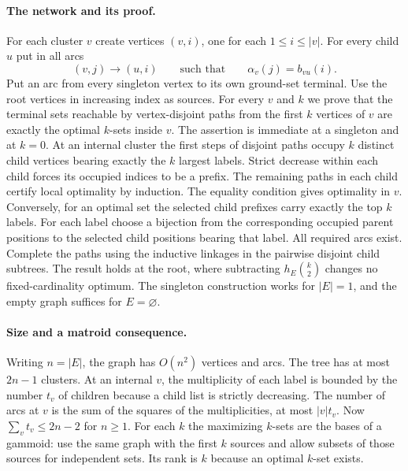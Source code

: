 \documentclass[11pt,a4paper]{article}
\begin{document}
\paragraph{The network and its proof.}
For each cluster $v$ create vertices $(v,i)$, one for each $1\le i\le |v|$.
For every child $u$ put in all arcs
\[
        (v,j)\longrightarrow(u,i)
        \qquad\text{such that}\qquad
        \alpha_v(j)=b_{vu}(i).
\]
Put an arc from every singleton vertex to its own ground-set terminal.
Use the root vertices in increasing index as sources.
For every $v$ and $k$ we prove that the terminal sets reachable by
vertex-disjoint paths from the first $k$ vertices of $v$ are exactly the
optimal $k$-sets inside $v$. The assertion is immediate at a singleton
and at $k=0$. At an internal cluster the first steps of disjoint paths
occupy $k$ distinct child vertices bearing exactly the $k$ largest labels.
Strict decrease within each child forces its occupied indices to be a
prefix. The remaining paths in each child certify local optimality by
induction. The equality condition gives optimality in $v$. Conversely,
for an optimal set the selected child prefixes carry exactly the top $k$
labels. For each label choose a bijection from the corresponding occupied
parent positions to the selected child positions bearing that label.
All required arcs exist. Complete the paths using the inductive linkages
in the pairwise disjoint child subtrees. The result holds at the root,
where subtracting $h_E\binom k2$ changes no fixed-cardinality optimum.
The singleton construction works for $|E|=1$, and the empty graph suffices
for $E=\varnothing$.

\paragraph{Size and a matroid consequence.}
Writing $n=|E|$, the graph has $O(n^2)$ vertices and arcs.
The tree has at most $2n-1$ clusters. At an internal $v$, the multiplicity
of each label is bounded by the number $t_v$ of children because a child
list is strictly decreasing. The number of arcs at $v$ is the sum of the
squares of the multiplicities, at most $|v|t_v$. Now
$\sum_v t_v\le 2n-2$ for $n\ge1$. For each $k$ the maximizing $k$-sets
are the bases of a gammoid: use the same graph with the first $k$ sources
and allow subsets of those sources for independent sets. Its rank is $k$
because an optimal $k$-set exists.
\end{document}
